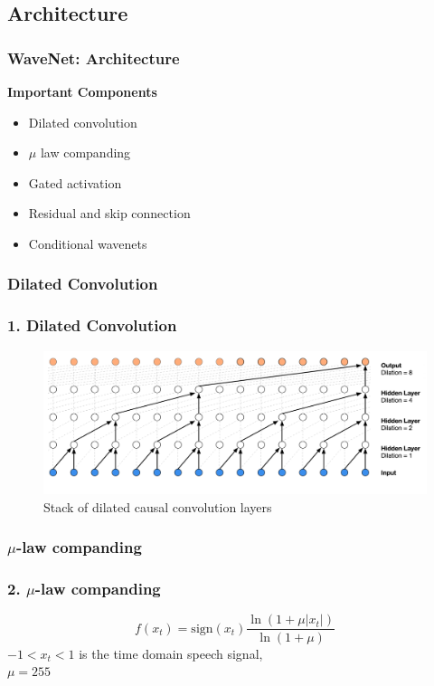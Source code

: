 \documentclass{beamer}
\begin{document}
  \subsection{Architecture}
  \begin{frame}
    \frametitle{WaveNet: Architecture}
    \textbf{Important Components}\\
      \begin{itemize}
        \item Dilated convolution
        \item $\mu$ law companding
        \item Gated activation
        \item Residual and skip connection
        \item Conditional wavenets
      \end{itemize}
  \end{frame}

  \subsubsection{Dilated Convolution}
  \begin{frame}
    \frametitle{1. Dilated Convolution}
    \begin{figure}
      \includegraphics[scale=0.22]{images/wavenet_arch_dilated_conv.png}
      \caption{Stack of dilated causal convolution layers}
    \end{figure}
  \end{frame}

  \subsubsection{$\mu$-law companding}
  \begin{frame}
    \frametitle{2. $\mu$-law companding}
    \centering
    \begin{equation*}
      f(x_t) = \text{sign}(x_t)\frac{\ln(1 + \mu|x_t|)}{\ln(1 + \mu)}
    \end{equation*}
    $-1 < x_t < 1$ is the time domain speech signal,\\
    $\mu = 255$
  \end{frame}
\end{document}
